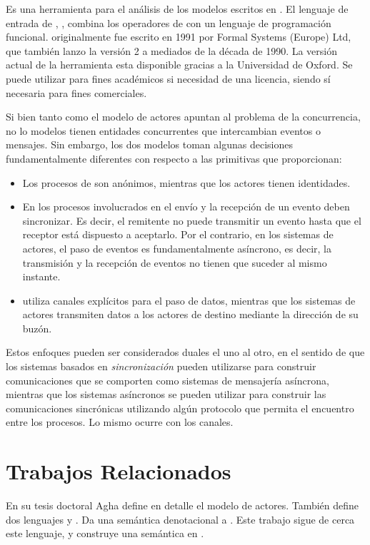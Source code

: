 Es una herramienta para el análisis de los modelos escritos en \CSP. El lenguaje de entrada de \FDR, \CSPm, combina los operadores de \CSP con un lenguaje de programación funcional. \FDR originalmente fue escrito en 1991 por Formal Systems (Europe) Ltd, que también lanzo la versión 2 a mediados de la década de 1990. La versión actual de la herramienta esta disponible gracias a la Universidad de Oxford. Se puede utilizar para fines académicos si necesidad de una licencia, siendo sí necesaria para fines comerciales.

Si bien tanto \CSP como el modelo de actores apuntan al problema de la concurrencia, no lo modelos tienen entidades concurrentes que intercambian eventos o mensajes. Sin embargo, los dos modelos toman algunas decisiones fundamentalmente diferentes con respecto a las primitivas que proporcionan:

\begin{itemize}
\item Los procesos de \CSP son anónimos, mientras que los actores tienen identidades.
\item En \CSP los procesos involucrados en el envío y la recepción de un evento deben sincronizar. Es decir, el remitente no puede transmitir un evento hasta que el receptor está dispuesto a aceptarlo. Por el contrario, en los sistemas de actores, el paso de eventos es fundamentalmente asíncrono, es decir, la transmisión y la recepción de eventos no tienen que suceder al mismo instante.
\item \CSP utiliza canales explícitos para el paso de datos, mientras que los sistemas de actores transmiten datos a los actores de destino mediante la dirección de su buzón.
\end{itemize}

Estos enfoques pueden ser considerados duales el uno al otro, en el sentido de que los sistemas basados en \emph{sincronización} pueden utilizarse para construir comunicaciones que se comporten como sistemas de mensajería asíncrona, mientras que los sistemas asíncronos se pueden utilizar para construir las comunicaciones sincrónicas utilizando algún protocolo que permita el encuentro entre los procesos. Lo mismo ocurre con los canales.

\section{Trabajos Relacionados}

En su tesis doctoral Agha\cite{Agha:1986:AMC:7929} define en detalle el modelo de actores. También define dos lenguajes \SAL y \ACT. Da una semántica denotacional a \SAL. Este trabajo sigue de cerca este lenguaje, y construye una semántica en \CSP.

